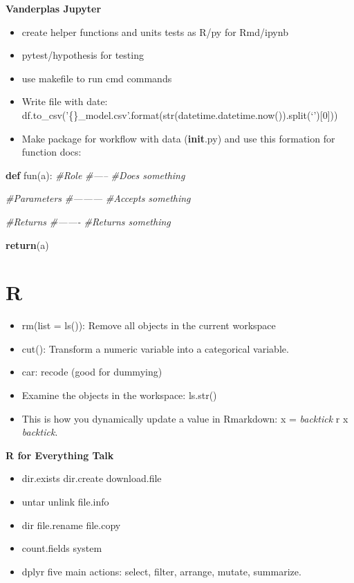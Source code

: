 \documentclass[]{book}
\newenvironment{Shaded}{\begin{snugshade}}{\end{snugshade}}
\newcommand{\KeywordTok}[1]{\textcolor[rgb]{0.13,0.29,0.53}{\textbf{#1}}}
\newcommand{\CommentTok}[1]{\textcolor[rgb]{0.56,0.35,0.01}{\textit{#1}}}
\newcommand{\ControlFlowTok}[1]{\textcolor[rgb]{0.13,0.29,0.53}{\textbf{#1}}}
\newcommand{\NormalTok}[1]{#1}
\theoremstyle{definition}
\theoremstyle{definition}
\theoremstyle{definition}
\theoremstyle{remark}
\begin{document}
\textbf{Vanderplas Jupyter}

\begin{itemize}
\item
  create helper functions and units tests as R/py for Rmd/ipynb
\item
  pytest/hypothesis for testing
\item
  use makefile to run cmd commands
\item
  Write file with date:
  df.to\_csv('\{\}\_model.csv'.format(str(datetime.datetime.now()).split(`'){[}0{]}))
\item
  Make package for workflow with data (\textbf{init}.py) and use this
  formation for function docs:
\end{itemize}

\begin{Shaded}
\begin{Highlighting}[]
\KeywordTok{def}\NormalTok{ fun(a):}
  \CommentTok{#Role}
  \CommentTok{#-----}
  \CommentTok{#Does something}
  
  \CommentTok{#Parameters}
  \CommentTok{#---------}
  \CommentTok{#Accepts something}
  
  \CommentTok{#Returns}
  \CommentTok{#-------}
  \CommentTok{#Returns something}
  
  \ControlFlowTok{return}\NormalTok{(a)}
\end{Highlighting}
\end{Shaded}

\section{R}\label{r-1}

\begin{itemize}
\item
  rm(list = ls()): Remove all objects in the current workspace
\item
  cut(): Transform a numeric variable into a categorical variable.
\item
  car: recode (good for dummying)
\item
  Examine the objects in the workspace: ls.str()
\item
  This is how you dynamically update a value in Rmarkdown: x =
  \emph{backtick} r x \emph{backtick}.
\end{itemize}

\textbf{R for Everything Talk}

\begin{itemize}
\item
  dir.exists \textbar{} dir.create \textbar{} download.file
\item
  untar \textbar{} unlink \textbar{} file.info
\item
  dir \textbar{} file.rename \textbar{} file.copy
\item
  count.fields \textbar{} system
\item
  dplyr five main actions: select, filter, arrange, mutate, summarize.
\end{itemize}
\end{document}
